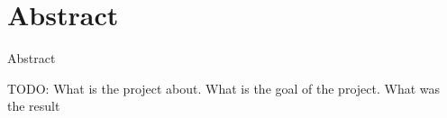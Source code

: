 \section*{Abstract}

Abstract

TODO: What is the project about. What is the goal of the project. What was the result